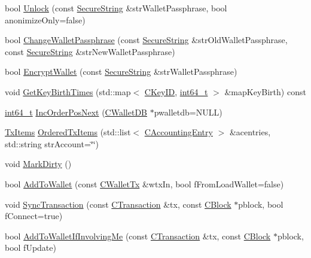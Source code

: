 \begin{DoxyCompactItemize}
\item 
bool \hyperlink{class_c_wallet_a654ae5a3a7c4c7c7bfd271f108781b40}{Unlock} (const \hyperlink{allocators_8h_a396ed773a5ac24aec28c8f7dc413c7ac}{Secure\+String} \&str\+Wallet\+Passphrase, bool anonimize\+Only=false)
\item 
bool \hyperlink{class_c_wallet_a4abcec3066e7c462f4564c159fc15031}{Change\+Wallet\+Passphrase} (const \hyperlink{allocators_8h_a396ed773a5ac24aec28c8f7dc413c7ac}{Secure\+String} \&str\+Old\+Wallet\+Passphrase, const \hyperlink{allocators_8h_a396ed773a5ac24aec28c8f7dc413c7ac}{Secure\+String} \&str\+New\+Wallet\+Passphrase)
\item 
bool \hyperlink{class_c_wallet_ab34fe5bf771619dcbe22a65f013e5469}{Encrypt\+Wallet} (const \hyperlink{allocators_8h_a396ed773a5ac24aec28c8f7dc413c7ac}{Secure\+String} \&str\+Wallet\+Passphrase)
\item 
void \hyperlink{class_c_wallet_a15a34ea53ce86d9f613693b09b74807f}{Get\+Key\+Birth\+Times} (std\+::map$<$ \hyperlink{class_c_key_i_d}{C\+Key\+I\+D}, \hyperlink{stdint_8h_adec1df1b8b51cb32b77e5b86fff46471}{int64\+\_\+t} $>$ \&map\+Key\+Birth) const 
\item 
\hyperlink{stdint_8h_adec1df1b8b51cb32b77e5b86fff46471}{int64\+\_\+t} \hyperlink{class_c_wallet_a7a76d68661e6879651ac0b11f2893e58}{Inc\+Order\+Pos\+Next} (\hyperlink{class_c_wallet_d_b}{C\+Wallet\+D\+B} $\ast$pwalletdb=N\+U\+L\+L)
\item 
\hyperlink{class_c_wallet_ac35fb148c0967ad24db292435b54ad85}{Tx\+Items} \hyperlink{class_c_wallet_a740572131004d77fbdb4617ec1aafb4a}{Ordered\+Tx\+Items} (std\+::list$<$ \hyperlink{class_c_accounting_entry}{C\+Accounting\+Entry} $>$ \&acentries, std\+::string str\+Account=\char`\"{}\char`\"{})
\item 
void \hyperlink{class_c_wallet_a26fd9a9f48230daf346500d2afb6115e}{Mark\+Dirty} ()
\item 
bool \hyperlink{class_c_wallet_adf34c789fd6eab1eeed22ef16837f558}{Add\+To\+Wallet} (const \hyperlink{class_c_wallet_tx}{C\+Wallet\+Tx} \&wtx\+In, bool f\+From\+Load\+Wallet=false)
\item 
void \hyperlink{class_c_wallet_ac18895d63adb58d85558f0efd6addb3f}{Sync\+Transaction} (const \hyperlink{class_c_transaction}{C\+Transaction} \&tx, const \hyperlink{class_c_block}{C\+Block} $\ast$pblock, bool f\+Connect=true)
\item 
bool \hyperlink{class_c_wallet_a487f7cba517d37d24e5fa422711574d9}{Add\+To\+Wallet\+If\+Involving\+Me} (const \hyperlink{class_c_transaction}{C\+Transaction} \&tx, const \hyperlink{class_c_block}{C\+Block} $\ast$pblock, bool f\+Update)

\end{DoxyCompactItemize}
